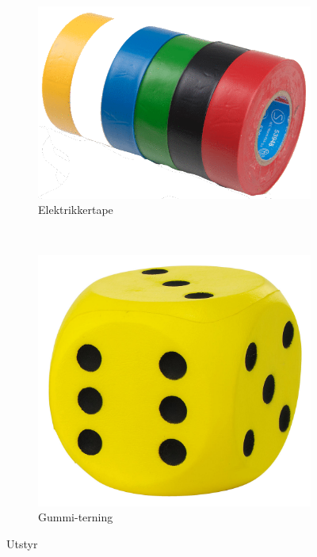 \documentclass[10pt,a4paper,norsk,openany]{book}
\begin{document}
\begin{figure}
    \centering
    \begin{subfigure}[b]{0.45\textwidth}
      \includegraphics[scale=0.2]{sportstape.png}
        \caption{Elektrikkertape}
        \label{fig:utstyr-terning}
    \end{subfigure}
    ~ %
    \begin{subfigure}[b]{0.45\textwidth}
        \includegraphics[scale=0.1]{terning.jpg}
        \caption{Gummi-terning}
        \label{fig:utstyr-terning}
    \end{subfigure}
    \caption{Utstyr}\label{fig:utstyr}
\end{figure}
\end{document}
